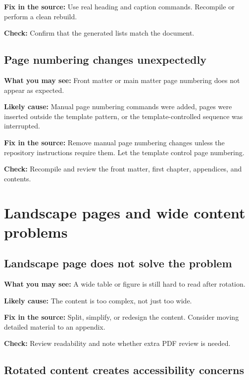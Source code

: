 \textbf{Fix in the source:} Use real heading and caption commands. Recompile or perform a clean rebuild.

\textbf{Check:} Confirm that the generated lists match the document.

\subsection{Page numbering changes unexpectedly}
\label{subsec:page-numbering-unexpected}

\textbf{What you may see:} Front matter or main matter page numbering does not appear as expected.

\textbf{Likely cause:} Manual page numbering commands were added, pages were inserted outside the template pattern, or the template-controlled sequence was interrupted.

\textbf{Fix in the source:} Remove manual page numbering changes unless the repository instructions require them. Let the template control page numbering.

\textbf{Check:} Recompile and review the front matter, first chapter, appendices, and contents.

\section{Landscape pages and wide content problems}
\label{sec:landscape-wide-problems}

\subsection{Landscape page does not solve the problem}
\label{subsec:landscape-does-not-solve}

\textbf{What you may see:} A wide table or figure is still hard to read after rotation.

\textbf{Likely cause:} The content is too complex, not just too wide.

\textbf{Fix in the source:} Split, simplify, or redesign the content. Consider moving detailed material to an appendix.

\textbf{Check:} Review readability and note whether extra PDF review is needed.

\subsection{Rotated content creates accessibility concerns}
\label{subsec:rotated-content-accessibility-concerns}

